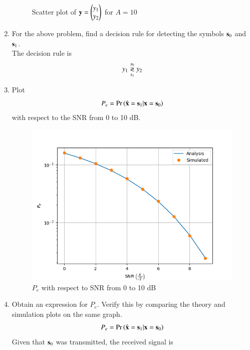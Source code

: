 \begin{enumerate}[label=\thesection.\arabic*.,ref=\thesection.\theenumi]
\begin{figure}
\caption{Scatter plot of $\mathbf{y} = \begin{pmatrix} y_1 \\ y_2 \end{pmatrix}$ for $A = 10$}
\label{fig:scatter_plt_y}
\end{figure}
%
\item
For the above problem, find a decision rule for detecting the symbols $\mathbf{s}_0 $ and $\mathbf{s}_1$.
\\
\solution The decision rule is
\begin{equation}
\label{eq:decision_rule}
y_1 \overset{s_0}{\underset{s_1}{\gtrless}} y_2
\end{equation}
%
\item
Plot 
\begin{equation} 
P_e = \Pr\left(\hat{\mathbf{x}} = \mathbf{s}_1|\mathbf{x} = \mathbf{s}_0\right)
\end{equation}
with respect to the SNR from 0 to 10 dB.
\\
\begin{figure}
\centering
\includegraphics[width=\columnwidth]{./figs/twoD/ber_snr_plot.png}
\caption{$P_e$ with respect to SNR from 0 to 10 dB}
\label{fig:ber_snr_plot}
\end{figure}
%
\item
Obtain an expression for $P_e$. Verify this by comparing the theory and simulation plots on the same graph.
\\
\solution 
\begin{align}
P_e = \Pr\left(\hat{\mathbf{x}} = \mathbf{s}_1|\mathbf{x} = \mathbf{s}_0\right)
\end{align}
Given that $\mathbf{s}_0$ was transmitted, the received signal is

\end{enumerate}
